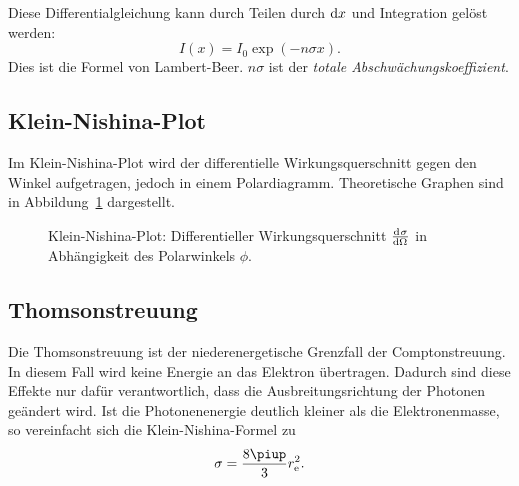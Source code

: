 \documentclass[11pt, ngerman, fleqn, DIV=15, headinclude, BCOR=2cm]{scrreprt}
\begin{document}
Diese Differentialgleichung kann durch Teilen durch $\dif x$ und Integration
gelöst werden:
\[
    I(x) = I_0 \exp(- n \sigma x).
\]
Dies ist die Formel von Lambert-Beer. $n \sigma$ ist der \emph{totale
Abschwächungskoeffizient}.

\subsection{Klein-Nishina-Plot}

Im Klein-Nishina-Plot wird der differentielle Wirkungsquerschnitt gegen den
Winkel aufgetragen, jedoch in einem Polardiagramm. Theoretische Graphen sind in
Abbildung~\ref{fig:nishina-theo} dargestellt.

\begin{figure}[htbp]
    \centering
    \caption{%
        Klein-Nishina-Plot: Differentieller Wirkungsquerschnitt
        $\od\sigma\Omega$ in Abhängigkeit des Polarwinkels $\phi$.
    }
    \label{fig:nishina-theo}
\end{figure}

\subsection{Thomsonstreuung}

Die Thomsonstreuung ist der niederenergetische Grenzfall der Comptonstreuung.
In diesem Fall wird keine Energie an das Elektron übertragen. Dadurch sind
diese Effekte nur dafür verantwortlich, dass die Ausbreitungsrichtung der
Photonen geändert wird. Ist die Photonenenergie deutlich kleiner als die
Elektronenmasse, so vereinfacht sich die Klein-Nishina-Formel zu
\parencite[(2.115)]{Leo/Techniques_Nuclear_Experiments}
\[
    \sigma = \frac{8\piup}3 r_\text e^2.
\]
\end{document}
